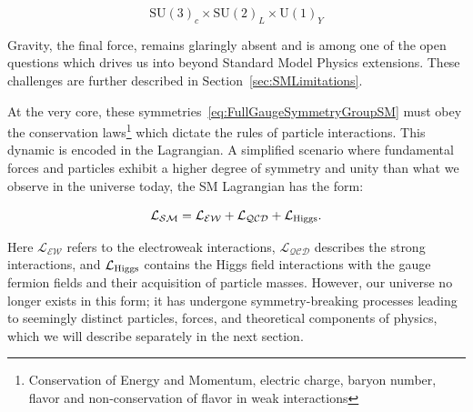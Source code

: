 \begin{equation}\label{eq:FullGaugeSymmetryGroupSM}
	\mathrm{SU}(3)_c \times \mathrm{SU}(2)_L \times \mathrm{U}(1)_Y
\end{equation}

Gravity, the final force, remains glaringly absent and is among one of the open questions which drives us into beyond Standard Model Physics extensions. These challenges are further described in Section~\ref{sec:SMLimitations}. 

At the very core, these symmetries~\ref{eq:FullGaugeSymmetryGroupSM} must obey the conservation laws\footnote{Conservation of Energy and Momentum, electric charge, baryon number, flavor and non-conservation of flavor in weak interactions} which dictate the rules of particle interactions. This dynamic is encoded in the  Lagrangian. A simplified scenario where fundamental forces and particles exhibit a higher degree of symmetry and unity than what we observe in the universe today, the SM Lagrangian has the form: 


\begin{equation}
    \mathcal{L_{SM}} = \mathcal{L_{EW}} +  \mathcal{L_{QCD}} +  \mathcal{L_{\textnormal{Higgs}}}.
\end{equation}



Here $\mathcal{L_{EW}}$ refers to the electroweak interactions, $\mathcal{L_{QCD}}$ describes the strong interactions, and $\mathcal{L_{\textnormal{Higgs}}}$ contains the Higgs field interactions with the gauge fermion fields and their acquisition of particle masses. However, our universe no longer exists in this form; it has undergone symmetry-breaking processes leading to seemingly distinct particles, forces, and theoretical components of physics, which we will describe separately in the next section.

